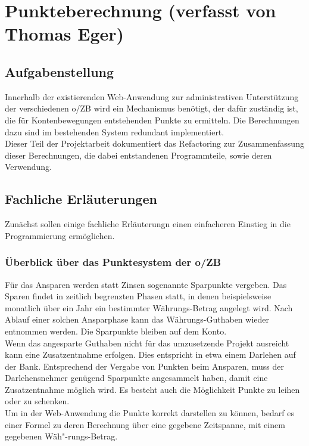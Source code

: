 \documentclass[12pt]{scrreprt}
\begin{document}
  
\chapter{Punkteberechnung (verfasst von Thomas Eger)}

\section{Aufgabenstellung}

Innerhalb der existierenden Web-Anwendung zur administrativen Unterstützung der verschiedenen o/ZB wird ein Mechanismus benötigt, der dafür zuständig ist, die für Kontenbewegungen entstehenden Punkte zu ermitteln. Die Berechnungen dazu sind im bestehenden System redundant implementiert. \\

Dieser Teil der Projektarbeit dokumentiert das Refactoring zur Zusammenfassung dieser Berechnungen, die dabei entstandenen Programmteile, sowie deren Verwendung. 

\section{Fachliche Erläuterungen}
Zunächst sollen einige fachliche Erläuterungn einen einfacheren Einstieg in die Programmierung ermöglichen.  

\subsection{Überblick über das Punktesystem der o/ZB}
Für das Ansparen werden statt Zinsen sogenannte Sparpunkte vergeben. Das Sparen findet in zeitlich begrenzten Phasen statt, in denen beispielsweise monatlich über ein Jahr ein bestimmter Währungs-Betrag angelegt wird. Nach Ablauf einer solchen Ansparphase kann das Währungs-Guthaben wieder entnommen werden. Die Sparpunkte bleiben auf dem Konto. \\

Wenn das angesparte Guthaben nicht für das umzusetzende Projekt ausreicht kann eine Zusatzentnahme erfolgen. Dies entspricht in etwa einem Darlehen auf der Bank. Entsprechend der Vergabe von Punkten beim Ansparen, muss der Darlehensnehmer genügend Sparpunkte angesammelt haben, damit eine Zusatzentnahme möglich wird. Es besteht auch die Möglichkeit Punkte zu leihen oder zu schenken. \\

Um in der Web-Anwendung die Punkte korrekt darstellen zu können, bedarf es einer Formel zu deren Berechnung über eine gegebene Zeitspanne, mit einem gegebenen Wäh{"-}rungs-Betrag. \\
\end{document}
